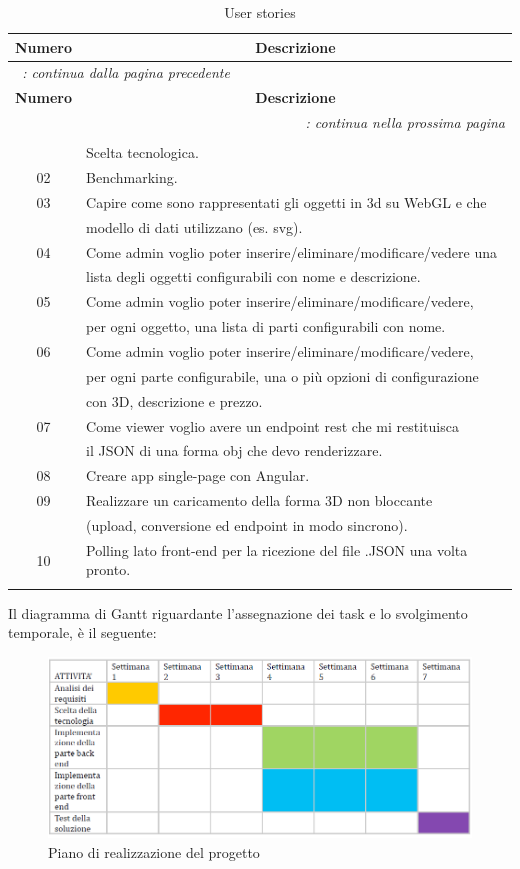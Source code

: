 \begin{longtable}{|c|l|}
	\hline
	\multicolumn{1}{|c|}{\textbf{Numero}} & \multicolumn{1}{c|}{\textbf{Descrizione}} \\
	\endfirsthead
	\multicolumn{2}{l}{\footnotesize\itshape\tablename~\thetable:
		continua dalla pagina precedente} \\
	\hline
	\multicolumn{1}{|c|}{\textbf{Numero}} & \multicolumn{1}{c|}{\textbf{Descrizione}} \\
	\endhead
	\multicolumn{2}{r}{\footnotesize\itshape\tablename~\thetable:
		continua nella prossima pagina} \\
	\endfoot
	\multicolumn{2}{r}{} \\
	\endlastfoot
	\hline
	01 & Scelta tecnologica.\\
	\hline
	02 & Benchmarking.\\
	\hline
	03 & Capire come sono rappresentati gli oggetti in 3d su WebGL e che\\ 
	& modello di dati utilizzano (es. svg).\\
	\hline
	04 & Come admin voglio poter inserire/eliminare/modificare/vedere una\\
	& lista degli oggetti configurabili con nome e descrizione.\\
	\hline
	05 & Come admin voglio poter inserire/eliminare/modificare/vedere,\\  & per ogni oggetto, una lista di parti configurabili con nome.\\
	\hline
	06 & Come admin voglio poter inserire/eliminare/modificare/vedere,\\  & per ogni parte configurabile, una o più opzioni di configurazione\\ & con 3D, descrizione e prezzo.\\
	\hline
	07 & Come viewer voglio avere un endpoint rest che mi restituisca\\   & il JSON di una forma obj che devo renderizzare.\\
	\hline
	08 & Creare app single-page con Angular.\\
	\hline
	09 & Realizzare un caricamento della forma 3D non bloccante\\ & (upload, conversione ed endpoint in modo sincrono).\\
	\hline
	10 & Polling lato front-end per la ricezione del file .JSON una volta pronto.\\
	\hline
	\caption{User stories}
	\label{tab:user:sto} \\
\end{longtable} 

Il diagramma di Gantt riguardante l'assegnazione dei task e lo svolgimento temporale, è il seguente:
\begin{figure}[h]
	\centering
	\includegraphics[scale=0.7]{Immagini/piano_realizzazione_progetto.png}
	\caption{Piano di realizzazione del progetto}
\end{figure}